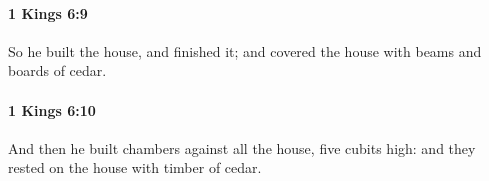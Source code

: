 		\paragraph{1 Kings 6:9} %
			\label{1KINGS-6-9}

			So he built the house, and finished it; and covered the house with beams and boards of cedar.


		\paragraph{1 Kings 6:10} %
			\label{1KINGS-6-10}

			And then he built chambers against all the house, five cubits high: and they rested on the house with timber of cedar.


